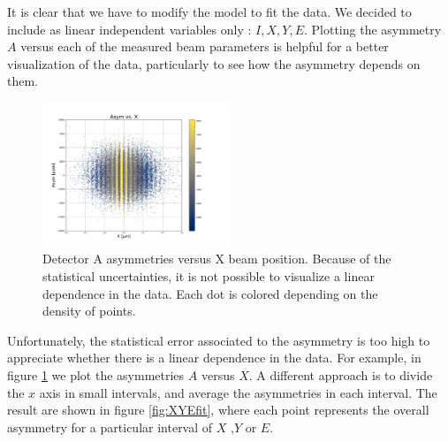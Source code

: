 
It is clear that we have to modify the model to fit the data. We decided to include as linear independent variables only : $I,X,Y,E$. 
Plotting the asymmetry $A$ versus each of the measured beam parameters is helpful for a better visualization of the data, particularly to see how the asymmetry depends on them. 

\begin{figure}[!hbtp]
\centering
\includegraphics[width = 0.5\textwidth]{Analysis/Fit/A_vs_X.pdf}
\caption{Detector A asymmetries versus X beam position. Because of the statistical uncertainties, it is not possible to visualize a linear dependence in the data. Each dot is colored depending on the density of points.}
\label{fig:AsymmetryA0vrX}
\end{figure}

Unfortunately, the statistical error associated to the asymmetry is too high to appreciate whether there is a linear dependence in the data. For example, in figure \ref{fig:AsymmetryA0vrX} we plot the asymmetries $A$ versus $X$.
A different approach is to divide the $x$ axis in small intervals, and average the asymmetries in each interval. The result are shown in figure \ref{fig:XYEfit}, where each point represents the overall asymmetry for a particular interval of $X$ ,$Y$ or $E$.
 
